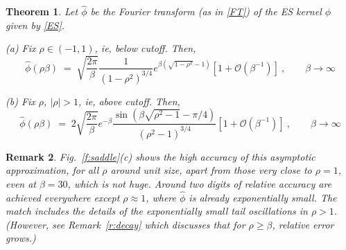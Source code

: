 \documentclass[10pt]{article}
\newcommand{\be}{\begin{equation}}
\newcommand{\ee}{\end{equation}}
\newcommand{\bigO}{{\mathcal O}}
\newtheorem{thm}{Theorem}
\newtheorem{rmk}[thm]{Remark}
\newcommand{\freq}{\beta}          %
\begin{document}
\begin{thm} %
  Let $\hat\phi$ be the Fourier transform (as in \eqref{FT}) of the ES kernel
  $\phi$ given by \eqref{ES}.
  
  (a)
  Fix $\rho\in(-1,1)$, ie, below cutoff. Then, %
\be
\hat\phi(\rho\freq) \; =\;
\sqrt{\frac{2\pi}{\beta}} \frac{1}{(1-\rho^2)^{3/4}} e^{\freq(\sqrt{1-\rho^2}-1)}
\left[ 1 + \bigO(\freq^{-1}) \right]
~, \qquad \freq\to\infty
\label{EShat1}
\ee

(b)
  Fix $\rho$, $|\rho| > 1$, ie, above cutoff. Then,
\be
\hat\phi(\rho\freq) \; =\;
2\sqrt{\frac{2\pi}{\beta}}
e^{-\freq}
\frac{\sin\left(\freq\sqrt{\rho^2-1} - \pi/4\right)}
{(\rho^2-1)^{3/4}}
\left[ 1 + \bigO(\freq^{-1}) \right]
~, \qquad \freq\to\infty
\label{EShat2}
\ee
\label{t:EShat}
\end{thm} %

\begin{rmk}
  Fig.~\ref{f:saddle}(c) shows the high accuracy of this
  asymptotic approximation, for all $\rho$ around unit size,
  apart from those very close to
  $\rho=1$, even at $\freq=30$, which is not huge.
  Around two digits of relative
  accuracy are achieved everywhere except $\rho\approx 1$, where $\hat\phi$
  is already exponentially small.
  The match includes the details of the exponentially small tail oscillations
  in $\rho>1$.
  (However, see Remark~\ref{r:decay} which discusses that for $\rho \ge \freq$,
  relative error grows.)
  \label{r:match}
\end{rmk}
\end{document}
